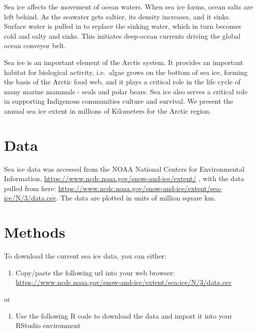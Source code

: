 \documentclass[
]{book}
\providecommand{\tightlist}{%
  \setlength{\itemsep}{0pt}\setlength{\parskip}{0pt}}
\begin{document}
Sea ice affects the movement of ocean waters. When sea ice forms, ocean salts are left behind. As the seawater gets saltier, its density increases, and it sinks. Surface water is pulled in to replace the sinking water, which in turn becomes cold and salty and sinks. This initiates deep-ocean currents driving the global ocean conveyor belt.

Sea ice is an important element of the Arctic system. It provides an important habitat for biological activity, i.e.~algae grows on the bottom of sea ice, forming the basis of the Arctic food web, and it plays a critical role in the life cycle of many marine mammals - seals and polar bears. Sea ice also serves a critical role in supporting Indigenous communities culture and survival. We present the annual sea ice extent in millions of Kilometers for the Arctic region.

\hypertarget{data-8}{%
\section{Data}\label{data-8}}

Sea ice data was accessed from the NOAA National Centers for Environmental Information, \url{https://www.ncdc.noaa.gov/snow-and-ice/extent/} , with the data pulled from here: \url{https://www.ncdc.noaa.gov/snow-and-ice/extent/sea-ice/N/3/data.csv}. The data are plotted in units of million square km.

\hypertarget{methods-7}{%
\section{Methods}\label{methods-7}}

To download the current sea ice data, you can either:

\begin{enumerate}
\def\labelenumi{\arabic{enumi})}
\tightlist
\item
  Copy/paste the following url into your web browser:
  \url{https://www.ncdc.noaa.gov/snow-and-ice/extent/sea-ice/N/3/data.csv}
\end{enumerate}

or

\begin{enumerate}
\def\labelenumi{\arabic{enumi})}
\setcounter{enumi}{1}
\tightlist
\item
  Use the following R code to download the data and import it into your RStudio environment
\end{enumerate}
\end{document}

